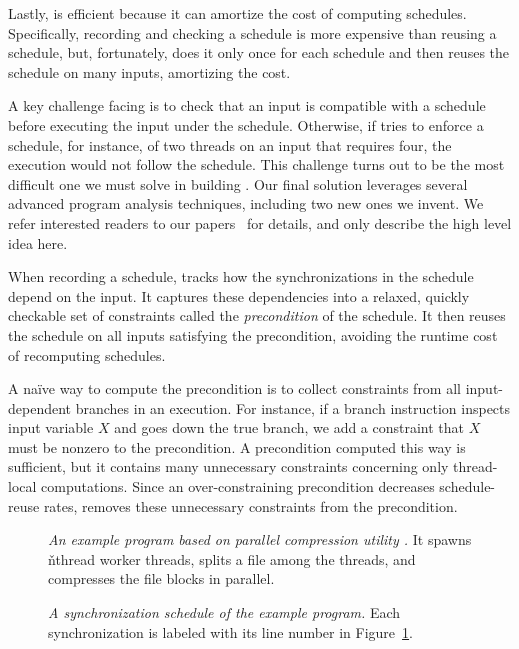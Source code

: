 Lastly, \tern is efficient because it can amortize the cost of computing
schedules.
Specifically, recording and checking a schedule is more expensive than
reusing a schedule,
but, fortunately, \tern does it only once for each schedule and then
reuses the schedule on many inputs, amortizing the cost.

A key challenge facing \tern is to check that an input is compatible with
a schedule before executing the input under the schedule.  Otherwise, if
\tern tries to enforce a schedule, for instance, of two threads on an input
that requires four, the execution would not follow the schedule.  This
challenge turns out to be the most difficult one we must solve in building
\tern.  Our final solution leverages several advanced program
analysis techniques, including two new ones we
invent.  We refer interested readers to our
papers~\cite{cui:tern:osdi10,peregrine:sosp11} for details, and only
describe the high level idea here.

When recording a schedule, \tern tracks how the synchronizations in the
schedule depend on the input.  It captures these dependencies into 
a relaxed, quickly checkable set of
constraints called the \emph{precondition} of the
schedule.  It then reuses the schedule on all inputs satisfying the 
precondition,
avoiding the runtime cost of recomputing schedules.

A na\"ive way to compute the precondition is to collect constraints from
all input-dependent branches in an execution.  For instance, if a branch
instruction inspects input variable $X$ and goes down the true branch,
we add a constraint that $X$ must be nonzero to the precondition.  A
precondition computed this way is sufficient, but it contains many
unnecessary constraints concerning only thread-local computations.  Since
an over-constraining precondition decreases schedule-reuse rates, \tern
removes these unnecessary constraints from the precondition.

\begin{figure}[t]
\centering \tiny {}
\caption{{\it An example program based on parallel compression utility
  \pbzip.}  It spawns \v{nthread} worker threads, splits a file among the
  threads, and compresses the file blocks in parallel.} \label{fig:pbzip2}
\end{figure}

\begin{figure}[t]
\centering
\begin{minipage}[c]{.9\linewidth}
\tiny {}
\end{minipage}
\caption{{\it A synchronization schedule of the example program.}  Each
  synchronization is labeled with its line number in
  Figure~\ref{fig:pbzip2}.} \label{fig:pbzip2-sync-order}
\end{figure}

